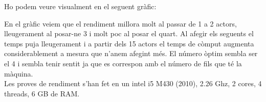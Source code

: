 \documentclass{report}
\begin{document}
Ho podem veure visualment en el seguent gràfic:

\begin{center}
\end{center}

En el gràfic veiem que el rendiment millora molt al passar de 1 a 2 actors, lleugerament al posar-ne 3 i molt poc al posar el quart.
Al afegir els seguents el temps puja lleugerament i a partir dels 15 actors el temps de còmput augmenta considerablement a mesura que n'anem afegint més. El número òptim sembla ser el 4 i sembla tenir sentit ja que es correspon amb el número de fils que té la màquina. \\

Les proves de rendiment s'han fet en un intel i5 M430 (2010), 2.26 Ghz, 2 cores, 4 threads, 6 GB de RAM.
\end{document}
